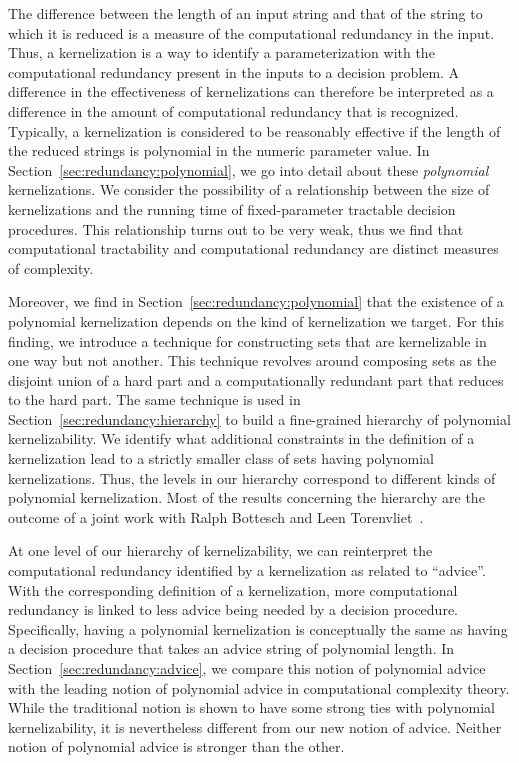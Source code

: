 The difference between the length of an input string and that of the string to which it is reduced is a measure of the computational redundancy in the input.
Thus, a kernelization is a way to identify a parameterization with the computational redundancy present in the inputs to a decision problem.
A difference in the effectiveness of kernelizations can therefore be interpreted as a difference in the amount of computational redundancy that is recognized.
Typically, a kernelization is considered to be reasonably effective if the length of the reduced strings is polynomial in the numeric parameter value.
In Section~\ref{sec:redundancy:polynomial}, we go into detail about these \emph{polynomial} kernelizations.
We consider the possibility of a relationship between the size of kernelizations and the running time of fixed-parameter tractable decision procedures.
This relationship turns out to be very weak, thus we find that computational tractability and computational redundancy are distinct measures of complexity.

Moreover, we find in Section~\ref{sec:redundancy:polynomial} that the existence of a polynomial kernelization depends on the kind of kernelization we target.
For this finding, we introduce a technique for constructing sets that are kernelizable in one way but not another.
This technique revolves around composing sets as the disjoint union of a hard part and a computationally redundant part that reduces to the hard part.
The same technique is used in Section~\ref{sec:redundancy:hierarchy} to build a fine-grained hierarchy of polynomial kernelizability.
We identify what additional constraints in the definition of a kernelization lead to a strictly smaller class of sets having polynomial kernelizations.
Thus, the levels in our hierarchy correspond to different kinds of polynomial kernelization.
Most of the results concerning the hierarchy are the outcome of a joint work with Ralph Bottesch and Leen Torenvliet~\parencite{witteveen2019hierarchy}.

At one level of our hierarchy of kernelizability, we can reinterpret the computational redundancy identified by a kernelization as related to \enquote{advice}.
With the corresponding definition of a kernelization, more computational redundancy is linked to less advice being needed by a decision procedure.
Specifically, having a polynomial kernelization is conceptually the same as having a decision procedure that takes an advice string of polynomial length.
In Section~\ref{sec:redundancy:advice}, we compare this notion of polynomial advice with the leading notion of polynomial advice in computational complexity theory.
While the traditional notion is shown to have some strong ties with polynomial kernelizability, it is nevertheless different from our new notion of advice.
Neither notion of polynomial advice is stronger than the other.

